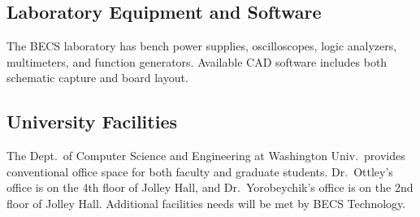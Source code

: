 \documentclass[11pt]{article}
\begin{document}
\subsection*{Laboratory Equipment and Software}

The BECS laboratory has bench power supplies, oscilloscopes, logic
analyzers, multimeters, and function generators.  Available CAD
software includes both schematic capture and board layout.

\subsection*{University Facilities}

The Dept.~of Computer Science and Engineering at
Washington Univ.~provides conventional office space
for both faculty and graduate students.
Dr.~Ottley's office is on the 4th floor of Jolley Hall,
and Dr.~Yorobeychik's office is on the 2nd floor of Jolley Hall.
Additional facilities needs will be met by BECS Technology.
\end{document}
